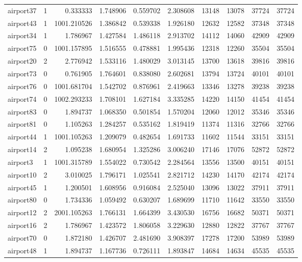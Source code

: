 \begin{longtable}{|l|r|r|r|r|r|r|r|r|r|}
airport37 & 1 & 0.333333 & 1.748906 & 0.559702 & 2.308608 & 13148 & 13078 & 37724 & 37724 \\
airport43 & 1 & 1001.210526 & 1.386842 & 0.539338 & 1.926180 & 12632 & 12582 & 37348 & 37348 \\
airport34 & 1 & 1.786967 & 1.427584 & 1.486118 & 2.913702 & 14112 & 14060 & 42909 & 42909 \\
airport75 & 0 & 1001.157895 & 1.516555 & 0.478881 & 1.995436 & 12318 & 12260 & 35504 & 35504 \\
airport20 & 2 & 2.776942 & 1.533116 & 1.480029 & 3.013145 & 13700 & 13618 & 39816 & 39816 \\
airport73 & 0 & 0.761905 & 1.764601 & 0.838080 & 2.602681 & 13794 & 13724 & 40101 & 40101 \\
airport76 & 0 & 1001.681704 & 1.542702 & 0.876961 & 2.419663 & 13346 & 13278 & 39238 & 39238 \\
airport74 & 0 & 1002.293233 & 1.708101 & 1.627184 & 3.335285 & 14220 & 14150 & 41454 & 41454 \\
airport83 & 0 & 1.894737 & 1.068350 & 0.501854 & 1.570204 & 12060 & 12012 & 35346 & 35346 \\
airport81 & 0 & 1.105263 & 1.284257 & 0.535162 & 1.819419 & 11374 & 11316 & 32766 & 32766 \\
airport44 & 1 & 1001.105263 & 1.209079 & 0.482654 & 1.691733 & 11602 & 11544 & 33151 & 33151 \\
airport14 & 2 & 1.095238 & 1.680954 & 1.325286 & 3.006240 & 17146 & 17076 & 52872 & 52872 \\
airport3 & 1 & 1001.315789 & 1.554022 & 0.730542 & 2.284564 & 13556 & 13500 & 40151 & 40151 \\
airport10 & 2 & 3.010025 & 1.796171 & 1.025541 & 2.821712 & 14230 & 14170 & 42174 & 42174 \\
airport45 & 1 & 1.200501 & 1.608956 & 0.916084 & 2.525040 & 13096 & 13022 & 37911 & 37911 \\
airport80 & 0 & 1.734336 & 1.059492 & 0.630207 & 1.689699 & 11710 & 11642 & 33550 & 33550 \\
airport12 & 2 & 2001.105263 & 1.766131 & 1.664399 & 3.430530 & 16756 & 16682 & 50371 & 50371 \\
airport16 & 2 & 1.786967 & 1.423572 & 1.806058 & 3.229630 & 12880 & 12822 & 37767 & 37767 \\
airport70 & 0 & 1.872180 & 1.426707 & 2.481690 & 3.908397 & 17278 & 17200 & 53989 & 53989 \\
airport48 & 1 & 1.894737 & 1.167736 & 0.726111 & 1.893847 & 14684 & 14634 & 45535 & 45535 \\

\end{longtable}

